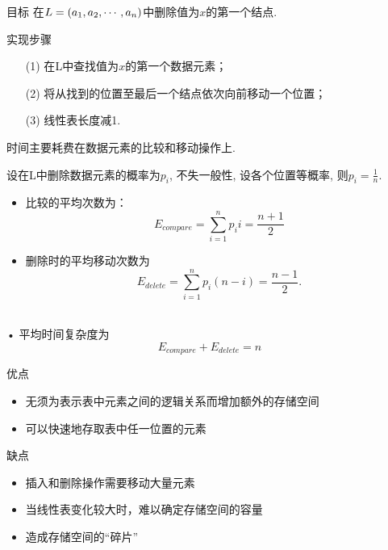 \begin{frame}\ft{\subsecname}
\begin{block}{目标}
在$L=(a_1,a_2,\cdots,a_n)$中删除值为$x$的第一个结点. 
\end{block}
\pause 
\begin{block}{实现步骤}
\begin{itemize}
\item[(1)]
在{\ttfamily L}中查找值为$x$的第一个数据元素；
\item[(2)]
将从找到的位置至最后一个结点依次向前移动一个位置；
\item[(3)]
线性表长度减1. 
\end{itemize}
\end{block}
\end{frame}


\begin{frame}[fragile]\ft{\subsecname}

\end{frame}

\begin{frame}\ft{\subsecname}
时间主要耗费在数据元素的比较和移动操作上. \vspace{0.1in}

 
设在{\ttfamily L}中删除数据元素的概率为$p_i$,  不失一般性,  设各个位置等概率,  则$p_i=\frac1{n}$. 
\begin{itemize}
\item 比较的平均次数为：
$$
E_{compare} = \sum_{i=1}^n p_i i= \frac{n+1}2
$$
\item 删除时的平均移动次数为
$$
E_{delete} =\sum_{i=1}^n p_i (n-i)=\frac {n-1}2.
$$\
\end{itemize}•
平均时间复杂度为
\[
E_{compare}+E_{delete}=n
\]

\end{frame}


\begin{frame}\ft{\subsecname}
  \begin{block}{优点}
    \begin{itemize}
    \item 无须为表示表中元素之间的逻辑关系而增加额外的存储空间
    \item 可以快速地存取表中任一位置的元素
    \end{itemize}
  \end{block}

  \pause

  \begin{block}{缺点}
    \begin{itemize}
    \item 插入和删除操作需要移动大量元素
    \item 当线性表变化较大时，难以确定存储空间的容量
    \item 造成存储空间的“碎片”
    \end{itemize}
  \end{block}


\end{frame}
